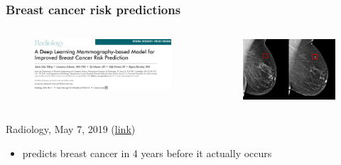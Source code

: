 \documentclass{beamer}
\begin{document}
\begin{frame}
\frametitle{Breast cancer risk predictions}
\begin{columns}
	\begin{column}{0.5\textwidth}
		\begin{figure}
			\centering
			\includegraphics[width=\textwidth]{images/breast_cancer_5_years.png}
		\end{figure}
	\end{column}
	\begin{column}{0.5\textwidth}
		\begin{figure}
			\centering
			\includegraphics[width=\textwidth]{images/BreastCancerAI.png}
		\end{figure}
	\end{column}
\end{columns}
Radiology, May 7, 2019 (\href{https://pubs.rsna.org/doi/10.1148/radiol.2019182716}{{\color{blue}\underline{link}}})
\begin{itemize}
	\item predicts breast cancer in 4 years before it actually occurs
\end{itemize}
\end{frame}
\end{document}
